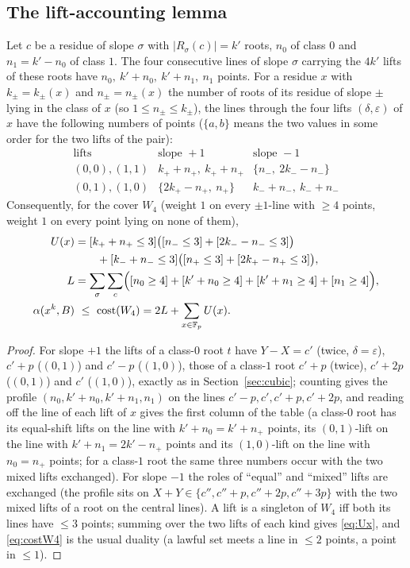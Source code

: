 \subsection*{The lift-accounting lemma}

\begin{lemma}\label{lem:lifts}
Let $c$ be a residue of slope $\sigma$ with $|R_\sigma(c)|=k'$ roots, $n_0$ of class $0$ and $n_1=k'-n_0$ of class $1$.  The four consecutive lines of slope
$\sigma$ carrying the $4k'$ lifts of these roots have $n_0,\ k'+n_0,\ k'+n_1,\ n_1$ points.  For a residue $x$ with $k_\pm=k_\pm(x)$ and $n_\pm=n_\pm(x)$
the number of roots of its residue of slope $\pm$ lying in the class of $x$ (so $1\le n_\pm\le k_\pm$), the lines through the four lifts
$(\delta,\varepsilon)$ of $x$ have the following numbers of points ($\{a,b\}$ means the two values in some order for the two lifts of the pair):
\[
\begin{array}{c|c|c}
\text{lifts} & \text{slope }+1 & \text{slope }-1\\ \hline
(0,0),(1,1) & k_++n_+,\ k_++n_+ & \{n_-,\ 2k_--n_-\}\\
(0,1),(1,0) & \{2k_+-n_+,\ n_+\} & k_-+n_-,\ k_-+n_-
\end{array}
\]
Consequently, for the cover $W_4$ (weight $1$ on every $\pm1$-line with $\ge4$ points, weight $1$ on every point lying on none of them),
\begin{align}
 U(x)&=[k_++n_+\le3]\bigl([n_-\le3]+[2k_--n_-\le3]\bigr)\notag\\
 &\qquad+[k_-+n_-\le3]\bigl([n_+\le3]+[2k_+-n_+\le3]\bigr),\label{eq:Ux}\\
 L&=\sum_\sigma\sum_c\Bigl([n_0\ge4]+[k'+n_0\ge4]+[k'+n_1\ge4]+[n_1\ge4]\Bigr),\label{eq:Lperm}\\
 \alpha(x^k,B)&\ \le\ \mathrm{cost}(W_4)=2L+\sum_{x\in\Fp}U(x).\label{eq:costW4}
\end{align}
\end{lemma}
\begin{proof}
For slope $+1$ the lifts of a class-$0$ root $t$ have $Y-X=c'$ (twice, $\delta=\varepsilon$), $c'+p$ ($(0,1)$) and $c'-p$ ($(1,0)$), those of a class-$1$ root
$c'+p$ (twice), $c'+2p$ ($(0,1)$) and $c'$ ($(1,0)$), exactly as in Section~\ref{sec:cubic}; counting gives the profile $(n_0,k'+n_0,k'+n_1,n_1)$ on the lines
$c'-p,c',c'+p,c'+2p$, and reading off the line of each lift of $x$ gives the first column of the table (a class-$0$ root has its equal-shift lifts on the
line with $k'+n_0=k'+n_+$ points, its $(0,1)$-lift on the line with $k'+n_1=2k'-n_+$ points and its $(1,0)$-lift on the line with $n_0=n_+$ points; for a
class-$1$ root the same three numbers occur with the two mixed lifts exchanged).  For slope $-1$ the roles of ``equal'' and ``mixed'' lifts are exchanged
(the profile sits on $X+Y\in\{c'',c''+p,c''+2p,c''+3p\}$ with the two mixed lifts of a root on the central lines).  A lift is a singleton of $W_4$ iff both its
lines have $\le3$ points; summing over the two lifts of each kind gives \eqref{eq:Ux}, and \eqref{eq:costW4} is the usual duality (a lawful set meets a line
in $\le2$ points, a point in $\le1$).
\end{proof}
